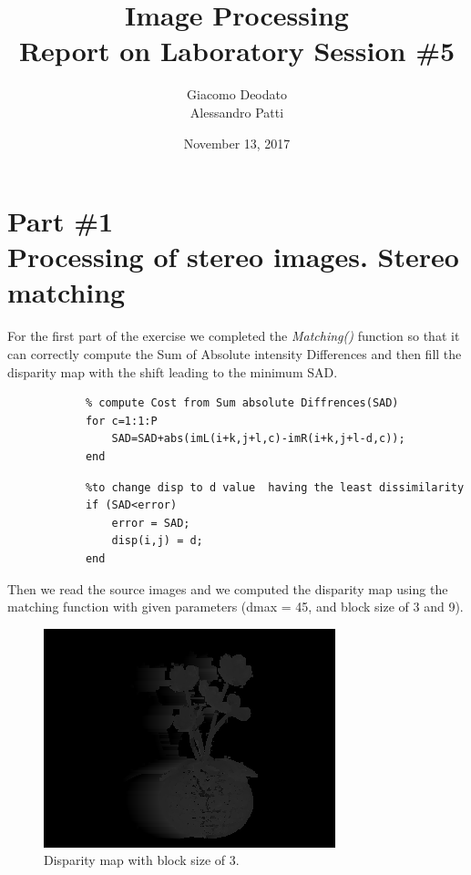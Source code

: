 \documentclass[12pt,a4paper,oneside,final,titlepage,openany,onecolumn]{article}
\author{Giacomo Deodato\\ Alessandro Patti}
\title{Image Processing\\ \textbf{Report on Laboratory Session \#5}}
\date{November 13, 2017}
\begin{document}
	\maketitle
	\section*{{\small Part \#1} \\ Processing of stereo images. Stereo matching}
		\par
		For the first part of the exercise we completed the \textit{Matching()} function so that it can correctly compute the Sum of Absolute intensity Differences and then fill the disparity map with the shift leading to the minimum SAD.
		\begin{lstlisting}
			% compute Cost from Sum absolute Diffrences(SAD)
			for c=1:1:P
				SAD=SAD+abs(imL(i+k,j+l,c)-imR(i+k,j+l-d,c));
			end
		\end{lstlisting}
		\begin{lstlisting}
			%to change disp to d value  having the least dissimilarity
			if (SAD<error)
				error = SAD;
				disp(i,j) = d;
			end 
		\end{lstlisting}
		\par
		Then we read the source images and we computed the disparity map using the matching function with given parameters (dmax = 45, and block size of 3 and 9).
		\begin{figure}[h!]
			\centering
			\includegraphics[width=0.8\linewidth]{images/disp_map2_01_3.png}
			\caption{Disparity map with block size of 3.}
		\end{figure}
\end{document}
